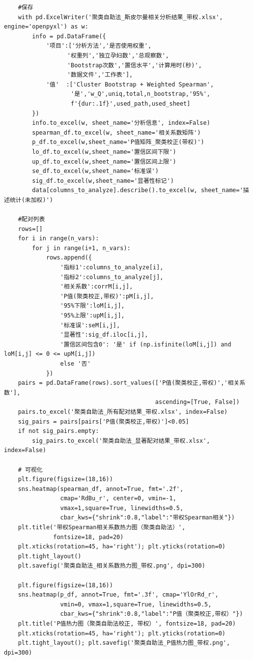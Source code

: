 \begin{lstlisting}
    #保存
    with pd.ExcelWriter('聚类自助法_斯皮尔曼相关分析结果_带权.xlsx', engine='openpyxl') as w:
        info = pd.DataFrame({
            '项目':['分析方法','是否使用权重',
                  '权重列','独立孕妇数','总观察数',
                  'Bootstrap次数','置信水平','计算用时(秒)',
                  '数据文件','工作表'],
            '值'  :['Cluster Bootstrap + Weighted Spearman',
                   '是','w_Q',uniq,total,n_bootstrap,'95%',
                   f'{dur:.1f}',used_path,used_sheet]
        })
        info.to_excel(w, sheet_name='分析信息', index=False)
        spearman_df.to_excel(w, sheet_name='相关系数矩阵')
        p_df.to_excel(w,sheet_name='P值矩阵_聚类校正(带权)')
        lo_df.to_excel(w,sheet_name='置信区间下限')
        up_df.to_excel(w,sheet_name='置信区间上限')
        se_df.to_excel(w,sheet_name='标准误')
        sig_df.to_excel(w,sheet_name='显著性标记')
        data[columns_to_analyze].describe().to_excel(w, sheet_name='描述统计(未加权)')

    #配对列表
    rows=[]
    for i in range(n_vars):
        for j in range(i+1, n_vars):
            rows.append({
                '指标1':columns_to_analyze[i],
                '指标2':columns_to_analyze[j],
                '相关系数':corrM[i,j],
                'P值(聚类校正,带权)':pM[i,j],
                '95%下限':loM[i,j],
                '95%上限':upM[i,j],
                '标准误':seM[i,j],
                '显著性':sig_df.iloc[i,j],
                '置信区间包含0': '是' if (np.isfinite(loM[i,j]) and loM[i,j] <= 0 <= upM[i,j]) 
                else '否'
            })
    pairs = pd.DataFrame(rows).sort_values(['P值(聚类校正,带权)','相关系数'], 
                                           ascending=[True, False])
    pairs.to_excel('聚类自助法_所有配对结果_带权.xlsx', index=False)
    sig_pairs = pairs[pairs['P值(聚类校正,带权)']<0.05]
    if not sig_pairs.empty:
        sig_pairs.to_excel('聚类自助法_显著配对结果_带权.xlsx', index=False)

    # 可视化
    plt.figure(figsize=(18,16))
    sns.heatmap(spearman_df, annot=True, fmt='.2f', 
                cmap='RdBu_r', center=0, vmin=-1, 
                vmax=1,square=True, linewidths=0.5, 
                cbar_kws={"shrink":0.8,"label":"带权Spearman相关"})
    plt.title('带权Spearman相关系数热力图（聚类自助法）', 
              fontsize=18, pad=20)
    plt.xticks(rotation=45, ha='right'); plt.yticks(rotation=0)
    plt.tight_layout()
    plt.savefig('聚类自助法_相关系数热力图_带权.png', dpi=300)

    plt.figure(figsize=(18,16))
    sns.heatmap(p_df, annot=True, fmt='.3f', cmap='YlOrRd_r',
                vmin=0, vmax=1,square=True, linewidths=0.5, 
                cbar_kws={"shrink":0.8,"label":"P值（聚类校正,带权）"})
    plt.title('P值热力图（聚类自助法校正, 带权）', fontsize=18, pad=20)
    plt.xticks(rotation=45, ha='right'); plt.yticks(rotation=0)
    plt.tight_layout(); plt.savefig('聚类自助法_P值热力图_带权.png', dpi=300)


\end{lstlisting}
